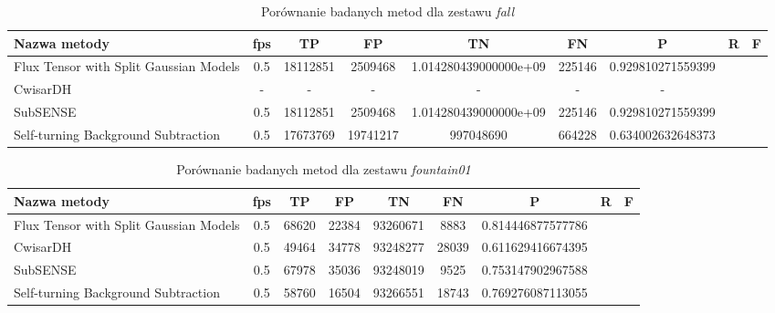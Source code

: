 \begin{table}[t]
\caption{Porównanie badanych metod dla zestawu \textit{fall}}
\label{tab:resultsFall}
\centering
\begin{tabular}{|l*{6}{|c}|}
  \hline 
  \textbf{Nazwa metody} & \textbf{fps} & \textbf{TP} & \textbf{FP} & \textbf{TN} & \textbf{FN} & \textbf{P} & \textbf{R} & \textbf{F}\\
  \hline
  Flux Tensor with Split Gaussian Models & 0.5 & 18112851 & 2509468 & 1.014280439000000e+09 & 225146 & 0.929810271559399\\
  \hline
  CwisarDH & - & - & - & - & - & -\\
  \hline
  SubSENSE & 0.5 & 18112851 & 2509468 & 1.014280439000000e+09 & 225146 & 0.929810271559399\\
  \hline
  Self-turning Background Subtraction & 0.5 & 17673769 & 19741217 & 997048690 & 664228 & 0.634002632648373\\
  \hline
\end{tabular}
\end{table}

\begin{table}[t]
\caption{Porównanie badanych metod dla zestawu \textit{fountain01}}
\label{tab:resultsFountain01}
\centering
\begin{tabular}{|l*{6}{|c}|}
  \hline 
  \textbf{Nazwa metody} & \textbf{fps} & \textbf{TP} & \textbf{FP} & \textbf{TN} & \textbf{FN} & \textbf{P} & \textbf{R} & \textbf{F}\\
  \hline
  Flux Tensor with Split Gaussian Models & 0.5 & 68620 & 22384 & 93260671 & 8883 & 0.814446877577786\\
  \hline
  CwisarDH & 0.5 & 49464 & 34778 & 93248277 & 28039 & 0.611629416674395\\
  \hline
  SubSENSE & 0.5 & 67978 & 35036 & 93248019 & 9525 & 0.753147902967588\\
  \hline
  Self-turning Background Subtraction & 0.5 & 58760 & 16504 & 93266551 & 18743 & 0.769276087113055\\
  \hline
\end{tabular}
\end{table}

